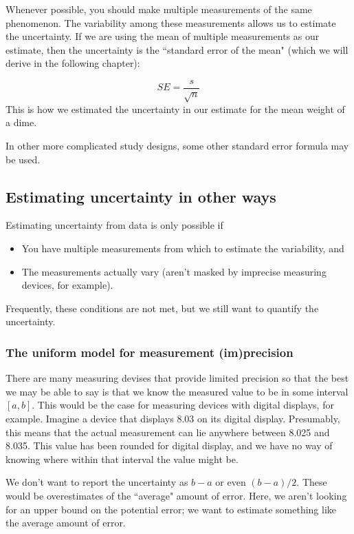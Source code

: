 \documentclass[twoside]{book}\usepackage[]{graphicx}\usepackage[]{xcolor}
\newcounter{example}[section]
\begin{document}
Whenever possible, you should make multiple measurements of the same phenomenon.
The variability among these measurements allows us to estimate the uncertainty.
If we are using the mean of multiple measurements as our estimate, then the uncertainty
is the ``standard error of the mean" (which we will derive in the following chapter):

\[ 
SE = \frac{s}{\sqrt{n}} 
\]
This is how we estimated the uncertainty in our estimate for the mean weight of a dime.

In other more complicated study designs, some other standard error formula may be used.

\subsection{Estimating uncertainty in other ways}
\label{sec:uncertainty-without-data}
Estimating uncertainty from data is only possible if 
\begin{itemize}
\item You have multiple measurements from which to estimate the variability, and 
\item The measurements actually vary (aren't masked by imprecise measuring devices, 
for example).
\end{itemize}

Frequently, these conditions are not met, but we still want to quantify the uncertainty.

\subsubsection{The uniform model for measurement (im)precision}
There are many measuring devises that provide limited precision so that the 
best we may be able to say is that we know the measured value to be in some interval $[a,b]$.
This would be the case for measuring devices with digital displays, for example.  
Imagine a device that displays 8.03 on its digital display.  
Presumably, this means that the actual measurement can lie anywhere between 
8.025 and 8.035.  This value has been rounded for digital display, and we 
have no way of knowing where within that interval the value might be.

We don't want to report the uncertainty as $b-a$ or even $(b-a)/2$.  These would be
overestimates of the ``average" amount of error.
Here, we aren't looking for an upper bound on the potential error; we want to estimate something 
like the average amount of error.
\end{document}
